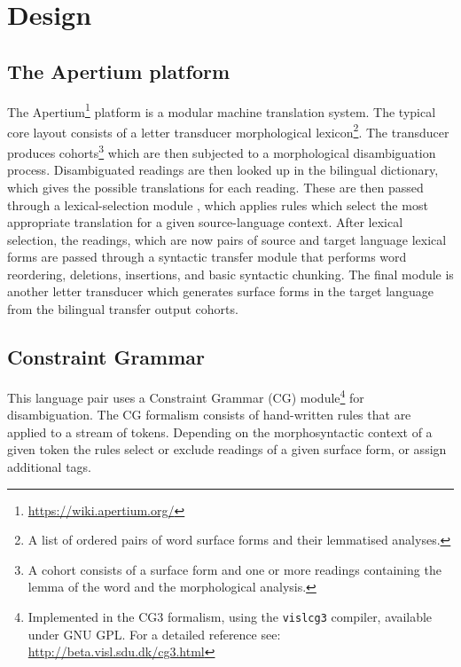 \section{Design}
\subsection{The Apertium platform}
\nocite{forcada2011apertium}
The Apertium\footnote{\url{https://wiki.apertium.org/}} platform is a
modular machine translation system. The typical core layout consists
of a letter transducer morphological lexicon\footnote{A list of
ordered pairs of word surface forms and their lemmatised
analyses.}. The transducer produces cohorts\footnote{A cohort 
consists of a surface form and one or more readings containing the lemma of the 
word and the morphological analysis.} which are then subjected to a
morphological disambiguation process.
%
Disambiguated readings are then looked up in the bilingual dictionary,
which gives the possible translations for each reading. These
are then passed through a lexical-selection module \citep{tyers12a}, 
which applies rules which select the most appropriate translation
for a given source-language context.
After lexical selection, the readings, which are now pairs of source
and target language lexical forms are passed through a 
syntactic transfer module that performs word reordering, deletions,
insertions, and basic syntactic chunking.
%
The final module is another letter transducer which generates
surface forms in the target language from the bilingual transfer
output cohorts.

\subsection{Constraint Grammar}
This language pair uses a Constraint Grammar (CG)
module\footnote{Implemented in the CG3 formalism, using the
  \texttt{vislcg3} compiler, available under GNU GPL. For a detailed
  reference see: \url{http://beta.visl.sdu.dk/cg3.html}} for
disambiguation. The CG formalism consists of hand-written rules that
are applied to a stream of tokens. Depending on the morphosyntactic
context of a given token the rules select or exclude readings of a
given surface form, or assign additional tags.
